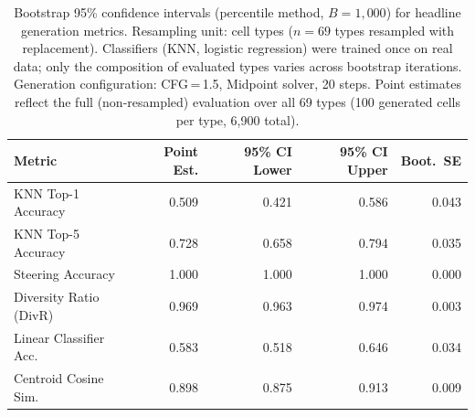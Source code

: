 \documentclass[biology,article,submit,pdftex,moreauthors]{Definitions/mdpi}
\begin{document}
\begin{table}[htbp]
\centering
\caption{Bootstrap 95\% confidence intervals (percentile method, $B{=}1{,}000$) for headline generation metrics. Resampling unit: cell types ($n{=}69$ types resampled with replacement). Classifiers (KNN, logistic regression) were trained once on real data; only the composition of evaluated types varies across bootstrap iterations. Generation configuration: CFG\,=\,1.5, Midpoint solver, 20 steps. Point estimates reflect the full (non-resampled) evaluation over all 69 types (100 generated cells per type, 6{,}900 total).}
\label{tab:s5_bootstrap_ci}
\begin{tabular}{lrrrr}
\toprule
Metric & Point Est. & 95\% CI Lower & 95\% CI Upper & Boot.\ SE \\
\midrule
KNN Top-1 Accuracy      & 0.509 & 0.421 & 0.586 & 0.043 \\
KNN Top-5 Accuracy      & 0.728 & 0.658 & 0.794 & 0.035 \\
Steering Accuracy       & 1.000 & 1.000 & 1.000 & 0.000 \\
Diversity Ratio (DivR)  & 0.969 & 0.963 & 0.974 & 0.003 \\
Linear Classifier Acc.  & 0.583 & 0.518 & 0.646 & 0.034 \\
Centroid Cosine Sim.    & 0.898 & 0.875 & 0.913 & 0.009 \\
\bottomrule
\end{tabular}
\end{table}

\FloatBarrier  %
\end{document}
